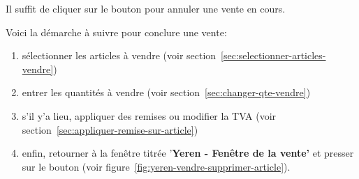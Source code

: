 

Il suffit de cliquer sur le bouton  pour annuler
une vente en cours.


\label{sec:conclure-une-vente}

Voici la d\'emarche \`a suivre pour conclure une vente:

\begin{enumerate}[1)]
	\item s\'electionner les articles \`a vendre
	(voir section~\ref{sec:selectionner-articles-vendre})
	
	\item entrer les quantit\'es \`a vendre 
	(voir section~\ref{sec:changer-qte-vendre})
	
	\item s'il y'a lieu, appliquer des remises ou modifier
	la TVA (voir section~\ref{sec:appliquer-remise-sur-article})
	
	\item enfin, retourner \`a la fen\^etre titr\'ee
	'\textbf{Yeren - Fen\^etre de la vente'} et
	presser sur le bouton 
	(voir figure~\ref{fig:yeren-vendre-supprimer-article}).
\end{enumerate}


